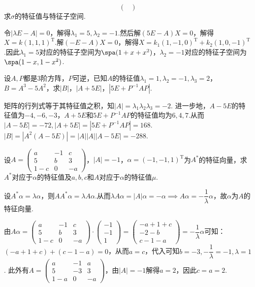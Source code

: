 \begin{exercise}
\begin{exgroup}
\[\begin{pmatrix}
            \end{pmatrix}\]
        求$\sigma$的特征值与特征子空间.
        \begin{answer}
            令$|\lambda E-A|=0$，解得$\lambda_1=5,\lambda_2=-1$.然后解$(5E-A)X=0$，解得$X=k(1,1,1)^\mathrm{T}$.解$(-E-A)X=0$，解得$X=k_1(1,-1,0)^\mathrm{T}+k_2(1,0,-1)^\mathrm{T}$.因此$\lambda_1=5$对应的特征子空间为$\spa(1+x+x^2)$，$\lambda_2=-1$对应的特征子空间为$\spa(1-x,1-x^2)$.
        \end{answer}
        \item 设$A,P$都是3阶方阵，$P$可逆，已知$A$的特征值$\lambda_1=1,\lambda_2=-1,\lambda_3=2$，$B=A^3-5A^2$，求$|B|$，$|A+5E|$，$|5E+P^{-1}AP|$.
        \begin{answer}
            矩阵的行列式等于其特征值之积，知$|A|=\lambda_1\lambda_2\lambda_3=-2$.
            进一步地，$A-5E$的特征值为$-4,-6,-3$，$A+5E$和$5E+P^{-1}AP$的特征值均为$6,4,7$.从而$|A-5E|=-72,|A+5E|=|5E+P^{-1}AP|=168$.
            $|B|=|A^2(A-5E)|=|A||A||A-5E|=-288$.
        \end{answer}
        \item 设$A=\begin{pmatrix}
                a & -1 & c \\ 5 & b & 3 \\ 1-c & 0 & -a
            \end{pmatrix}$，$|A|=-1$，$\alpha=(-1,-1,1)^\mathrm{T}$为$A^*$的特征向量，求$A^*$对应于$\alpha$的特征值及$a,b,c$和$A$对应于$\alpha$的特征值$\mu$.
        \begin{answer}
            设$A^*\alpha=\lambda \alpha$，则$AA^*\alpha=\lambda A\alpha$.从而$\lambda A\alpha=|A|\alpha=-\alpha\implies A\alpha=-\dfrac{1}{\lambda}\alpha$，故$\alpha$为$A$的特征向量.

            由$A\alpha=\begin{pmatrix}
                a & -1 & c \\ 5 & b & 3 \\ 1-c & 0 & -a
            \end{pmatrix}\cdot\begin{pmatrix}
                -1 \\ -1 \\ 1
            \end{pmatrix}=\begin{pmatrix}
                -a+1+c \\ -2-b \\ c-1-a
            \end{pmatrix}=-\dfrac{1}{\lambda}\alpha$可知：
            $(-a+1+c)+(c-1-a)=0$，从而$a=c$，代入可知$b=-3,-\dfrac{1}{\lambda}=-1,\lambda=1$.
            此外有$A=\begin{pmatrix}
                a & -1 & a \\ 5 & -3 & 3 \\ 1-a & 0 & -a
            \end{pmatrix}$，由$|A|=-1$解得$a=2$，因此$c=a=2$.
        \end{answer}


\end{exgroup}
\end{exercise}
